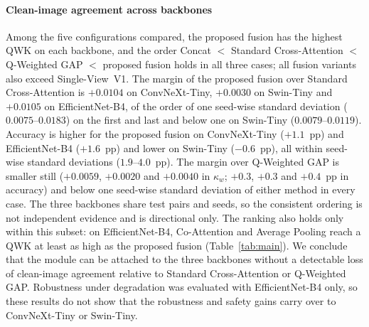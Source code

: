 \documentclass[final,5p,times,twocolumn,authoryear]{elsarticle}
\theoremstyle{plain}
\theoremstyle{remark}
\begin{document}
\paragraph{Clean-image agreement across backbones} Among the five configurations compared, the proposed fusion has the highest QWK on each backbone, and the order Concat $<$ Standard Cross-Attention $<$ Q-Weighted GAP $<$ proposed fusion holds in all three cases; all fusion variants also exceed Single-View~V1. The margin of the proposed fusion over Standard Cross-Attention is $+0.0104$ on ConvNeXt-Tiny, $+0.0030$ on Swin-Tiny and $+0.0105$ on EfficientNet-B4, of the order of one seed-wise standard deviation ($0.0075$--$0.0183$) on the first and last and below one on Swin-Tiny ($0.0079$--$0.0119$). Accuracy is higher for the proposed fusion on ConvNeXt-Tiny ($+1.1$~pp) and EfficientNet-B4 ($+1.6$~pp) and lower on Swin-Tiny ($-0.6$~pp), all within seed-wise standard deviations ($1.9$--$4.0$~pp). The margin over Q-Weighted GAP is smaller still ($+0.0059$, $+0.0020$ and $+0.0040$ in $\kappa_w$; $+0.3$, $+0.3$ and $+0.4$~pp in accuracy) and below one seed-wise standard deviation of either method in every case. The three backbones share test pairs and seeds, so the consistent ordering is not independent evidence and is directional only. The ranking also holds only within this subset: on EfficientNet-B4, Co-Attention and Average Pooling reach a QWK at least as high as the proposed fusion (Table~\ref{tab:main}). We conclude that the module can be attached to the three backbones without a detectable loss of clean-image agreement relative to Standard Cross-Attention or Q-Weighted GAP. Robustness under degradation was evaluated with EfficientNet-B4 only, so these results do not show that the robustness and safety gains carry over to ConvNeXt-Tiny or Swin-Tiny.
\end{document}
